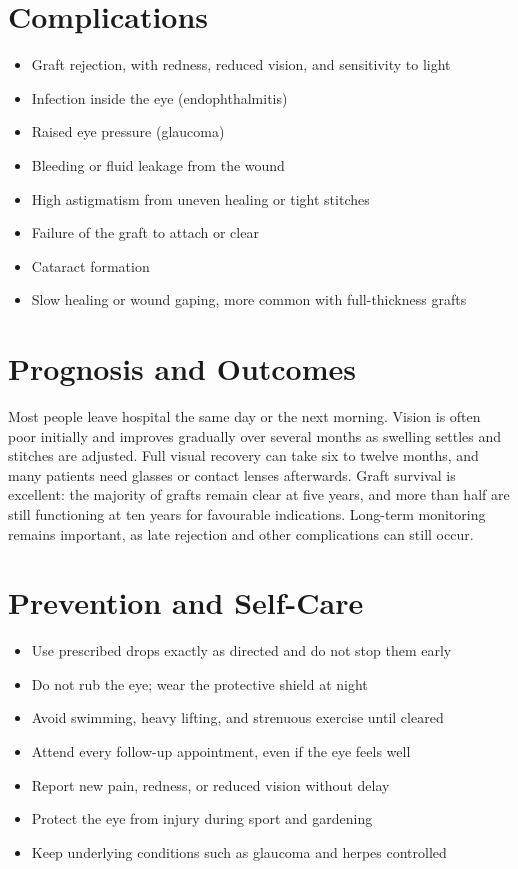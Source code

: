 \section*{Complications}
\begin{itemize}
    \item Graft rejection, with redness, reduced vision, and sensitivity to light
    \item Infection inside the eye (endophthalmitis)
    \item Raised eye pressure (glaucoma)
    \item Bleeding or fluid leakage from the wound
    \item High astigmatism from uneven healing or tight stitches
    \item Failure of the graft to attach or clear
    \item Cataract formation
    \item Slow healing or wound gaping, more common with full-thickness grafts
\end{itemize}

\section*{Prognosis and Outcomes}
Most people leave hospital the same day or the next morning. Vision is often poor initially and improves gradually over several months as swelling settles and stitches are adjusted. Full visual recovery can take six to twelve months, and many patients need glasses or contact lenses afterwards. Graft survival is excellent: the majority of grafts remain clear at five years, and more than half are still functioning at ten years for favourable indications. Long-term monitoring remains important, as late rejection and other complications can still occur.

\section*{Prevention and Self-Care}
\begin{itemize}
    \item Use prescribed drops exactly as directed and do not stop them early
    \item Do not rub the eye; wear the protective shield at night
    \item Avoid swimming, heavy lifting, and strenuous exercise until cleared
    \item Attend every follow-up appointment, even if the eye feels well
    \item Report new pain, redness, or reduced vision without delay
    \item Protect the eye from injury during sport and gardening
    \item Keep underlying conditions such as glaucoma and herpes controlled
\end{itemize}

